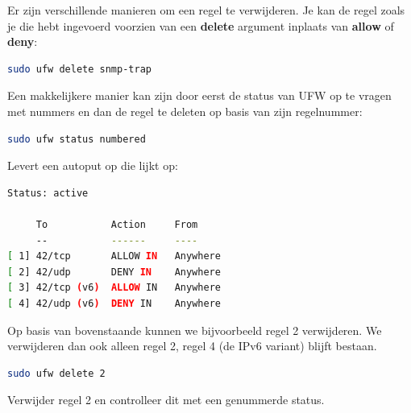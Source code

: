 Er zijn verschillende manieren om een regel te verwijderen. Je kan de regel zoals je die hebt ingevoerd voorzien van een \textbf{delete} argument inplaats van \textbf{allow} of \textbf{deny}:
\begin{lstlisting}[language=bash]
sudo ufw delete snmp-trap
\end{lstlisting}

Een makkelijkere manier kan zijn door eerst de status van UFW op te vragen met nummers en dan de regel te deleten op basis van zijn regelnummer:
\begin{lstlisting}[language=bash]
sudo ufw status numbered
\end{lstlisting}
Levert een autoput op die lijkt op:
\begin{lstlisting}[language=bash]
Status: active

     To           Action     From
     --           ------     ----
[ 1] 42/tcp       ALLOW IN   Anywhere
[ 2] 42/udp       DENY IN    Anywhere
[ 3] 42/tcp (v6)  ALLOW IN   Anywhere
[ 4] 42/udp (v6)  DENY IN    Anywhere
\end{lstlisting}
Op basis van bovenstaande kunnen we bijvoorbeeld regel 2 verwijderen. We verwijderen dan ook alleen regel 2, regel 4 (de IPv6 variant) blijft bestaan.
\begin{lstlisting}[language=bash]
sudo ufw delete 2
\end{lstlisting}
Verwijder regel 2 en controlleer dit met een genummerde status.

